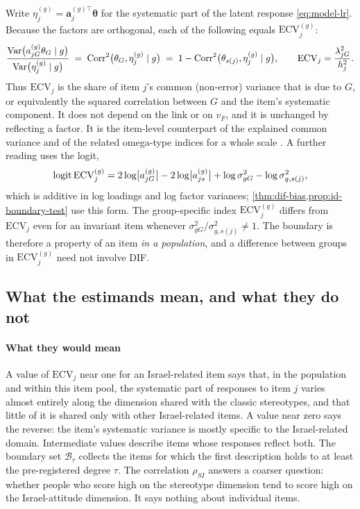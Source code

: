Write $\eta^{(g)}_j=\bm a_j^{(g)\top}\bm\theta$ for the systematic part of the latent response \eqref{eq:model-lr}. Because the factors are orthogonal, each of the following equals $\mathrm{ECV}^{(g)}_j$:
\begin{equation}\label{eq:model-ecv-forms}
  \frac{\operatorname{Var}\bigl(a^{(g)}_{jG}\theta_G\mid g\bigr)}{\operatorname{Var}\bigl(\eta^{(g)}_j\mid g\bigr)}
  \;=\;\operatorname{Corr}^2\bigl(\theta_G,\eta^{(g)}_j\mid g\bigr)
  \;=\;1-\operatorname{Corr}^2\bigl(\theta_{s(j)},\eta^{(g)}_j\mid g\bigr),
  \qquad
  \mathrm{ECV}_j=\frac{\lambda_{jG}^2}{h_j^2}.
\end{equation}
Thus $\mathrm{ECV}_j$ is the share of item $j$'s common (non-error) variance that is due to $G$, or equivalently the squared correlation between $G$ and the item's systematic component. It does not depend on the link or on $v_F$, and it is unchanged by reflecting a factor. It is the item-level counterpart of the explained common variance and of the related omega-type indices for a whole scale \citep{reise2012,rodriguez2016,zinbarg2005}. A further reading uses the logit,
\begin{equation}\label{eq:model-logit-ecv}
  \operatorname{logit}\mathrm{ECV}^{(g)}_j=2\log\bigl|a^{(g)}_{jG}\bigr|-2\log\bigl|a^{(g)}_{js}\bigr|+\log\sigma^2_{gG}-\log\sigma^2_{g,s(j)},
\end{equation}
which is additive in log loadings and log factor variances; \cref{thm:dif-bias,prop:id-boundary-test} use this form. The group-specific index $\mathrm{ECV}^{(g)}_j$ differs from $\mathrm{ECV}_j$ even for an invariant item whenever $\sigma^2_{gG}/\sigma^2_{g,s(j)}\neq1$. The boundary is therefore a property of an item \emph{in a population}, and a difference between groups in $\mathrm{ECV}^{(g)}_j$ need not involve DIF.

\subsection{What the estimands mean, and what they do not}\label{sec:model-meaning}

\paragraph{What they would mean}
A value of $\mathrm{ECV}_j$ near one for an Israel-related item says that, in the population and within this item pool, the systematic part of responses to item $j$ varies almost entirely along the dimension shared with the classic stereotypes, and that little of it is shared only with other Israel-related items. A value near zero says the reverse: the item's systematic variance is mostly specific to the Israel-related domain. Intermediate values describe items whose responses reflect both. The boundary set $\mathcal B_\tau$ collects the items for which the first description holds to at least the pre-registered degree $\tau$. The correlation $\rho_{SI}$ answers a coarser question: whether people who score high on the stereotype dimension tend to score high on the Israel-attitude dimension. It says nothing about individual items.

